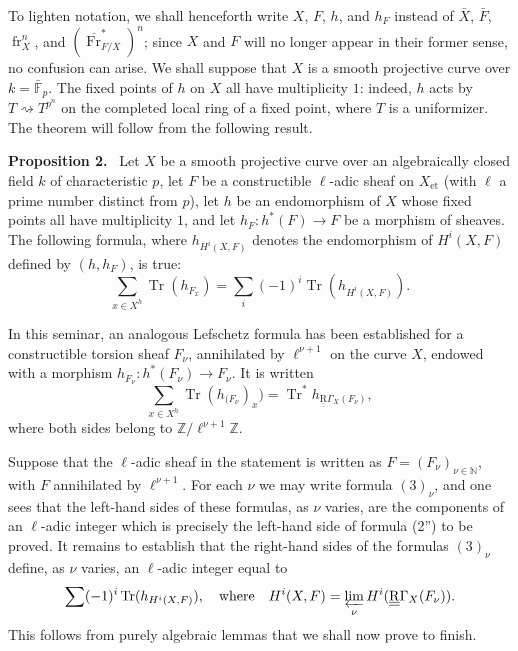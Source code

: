 \documentclass[11pt]{article}
\newenvironment{statement}[1]{\par\medskip\noindent\textbf{#1.}\ }{\par\medskip}
\providecommand{\Tr}{\operatorname{Tr}}
\providecommand{\Tr}{\operatorname{Tr}}
\providecommand{\Tr}{\operatorname{Tr}}
\providecommand{\Tr}{\operatorname{Tr}}
\providecommand{\Tr}{\operatorname{Tr}}
\providecommand{\fr}{\operatorname{fr}}
\providecommand{\Fr}{\operatorname{Fr}}
\providecommand{\Fr}{\operatorname{Fr}}
\providecommand{\fr}{\operatorname{fr}}
\begin{document}
To lighten notation, we shall henceforth write $X$, $F$, $h$, and $h_F$ instead of $\bar X$, $\bar F$, ${\fr}_X^n$, and $(\overline{\Fr}^*_{F/X})^n$; since $X$ and $F$ will no longer appear in their former sense, no confusion can arise. We shall suppose that $X$ is a smooth projective curve over $k=\bar{\mathbb F}_p$. The fixed points of $h$ on $X$ all have multiplicity $1$: indeed, $h$ acts by $T\rightsquigarrow T^{p^n}$ on the completed local ring of a fixed point, where $T$ is a uniformizer. The theorem will follow from the following result.

\begin{statement}{Proposition 2}
Let $X$ be a smooth projective curve over an algebraically closed field $k$ of characteristic $p$, let $F$ be a constructible $\ell$-adic sheaf on $X_{\mathrm{et}}$ (with $\ell$ a prime number distinct from $p$), let $h$ be an endomorphism of $X$ whose fixed points all have multiplicity $1$, and let $h_F:h^*(F)\to F$ be a morphism of sheaves. The following formula, where $h_{H^i(X,F)}$ denotes the endomorphism of $H^i(X,F)$ defined by $(h,h_F)$, is true:
\[
\sum_{x\in X^h}\Tr(h_{F_x})=\sum_i(-1)^i\Tr(h_{H^i(X,F)}).
\tag{2''}
\]
\end{statement}

In this seminar, an analogous Lefschetz formula has been established for a constructible torsion sheaf $F_\nu$, annihilated by $\ell^{\nu+1}$ on the curve $X$, endowed with a morphism $h_{F_\nu}:h^*(F_\nu)\to F_\nu$. It is written
\[
\sum_{x\in X^h}\Tr(h_{(F_\nu})_x)=\Tr^*h_{\underline{\underline{\mathrm{R}}}\Gamma_X(F_\nu)},
\tag{3}
\]
where both sides belong to $\mathbb Z/\ell^{\nu+1}\mathbb Z$.

Suppose that the $\ell$-adic sheaf in the statement is written as $F=(F_\nu)_{\nu\in\mathbb N}$, with $F$ annihilated by $\ell^{\nu+1}$. For each $\nu$ we may write formula $(3)_\nu$, and one sees that the left-hand sides of these formulas, as $\nu$ varies, are the components of an $\ell$-adic integer which is precisely the left-hand side of formula (2'') to be proved. It remains to establish that the right-hand sides of the formulas $(3)_\nu$ define, as $\nu$ varies, an $\ell$-adic integer equal to
\[
\sum(-1)^i\Tr(h_{H^i(X,F)}),
\quad\text{where}\quad
H^i(X,F)=\varprojlim_\nu H^i(\underline{\underline{\mathrm{R}}}\Gamma_X(F_\nu)).
\]
This follows from purely algebraic lemmas that we shall now prove to finish.
\end{document}
